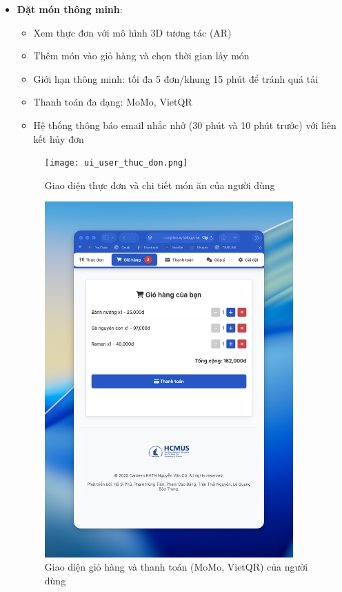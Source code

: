\documentclass[12pt,a4paper]{article}
\begin{document}
\begin{itemize}[leftmargin=1cm]
    \item \textbf{Đặt món thông minh}:
        \begin{itemize}[leftmargin=0.5cm]
            \item Xem thực đơn với mô hình 3D tương tác (AR)
            \item Thêm món vào giỏ hàng và chọn thời gian lấy món
            \item Giới hạn thông minh: tối đa 5 đơn/khung 15 phút để tránh quá tải
            \item Thanh toán đa dạng: MoMo, VietQR
            \item Hệ thống thông báo email nhắc nhở (30 phút và 10 phút trước) với liên kết hủy đơn
        \end{itemize}
\begin{figure}[H]
    \centering
    \texttt{[image: ui\_user\_thuc\_don.png]} %
    \caption{Giao diện thực đơn và chi tiết món ăn của người dùng}
    \label{fig:ui_user_menu}
\end{figure}
\begin{figure}[H]
    \centering
    \includegraphics[width=0.9\textwidth]{ui_user_gio_hang_thanh_toan.png} %
    \caption{Giao diện giỏ hàng và thanh toán (MoMo, VietQR) của người dùng}
    \label{fig:ui_user_cart_payment}
\end{figure}


\end{itemize}
\end{document}
